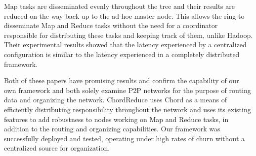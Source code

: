 Map tasks are disseminated evenly throughout the tree and their results are reduced on the way back up to the ad-hoc master node.  This allows the ring to disseminate Map and Reduce tasks without the need for a coordinator responsible for distributing these tasks and keeping track of them, unlike Hadoop.  Their experimental results showed that the latency experienced by a centralized configuration is similar to the latency experienced in a completely distributed framework.







Both of these papers have promising results and confirm the capability of our own framework and both solely examine P2P networks for the purpose of routing data and organizing the network. ChordReduce uses Chord as a means of efficiently distributing responsibility throughout the network and uses its existing features to add robustness to nodes working on Map and Reduce tasks, in addition to the routing  and organizing capabilities.  Our framework was successfully deployed and tested, operating under high rates of churn without a centralized source for organization. %




